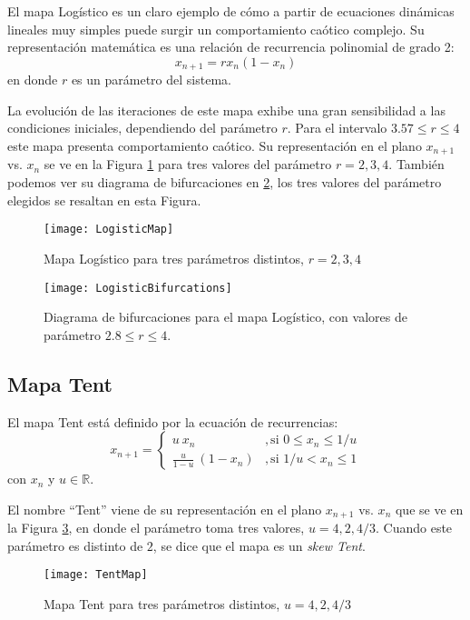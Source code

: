 El mapa Logístico es un claro ejemplo de cómo a partir de ecuaciones dinámicas lineales muy simples puede surgir un comportamiento caótico complejo. Su representación matemática es una relación de recurrencia polinomial de grado 2:
\begin{equation}\label{eqLogistico}
x_{n+1} = rx_n(1-x_n)
\end{equation}
en donde $r$ es un parámetro del sistema.

La evolución de las iteraciones de este mapa exhibe una gran sensibilidad a las condiciones iniciales, dependiendo del parámetro $r$. Para el intervalo $3.57 \leq r \leq 4$ este mapa presenta comportamiento caótico.
Su representación en el plano $x_{n+1}$ vs. $x_n$ se ve en la Figura \ref{figLogisticMap} para tres valores del parámetro $r = {2, 3, 4}$.
También podemos ver su diagrama de bifurcaciones en \ref{figLogisticBifurcations}, los tres valores del parámetro elegidos se resaltan en esta Figura.
\begin{figure}
	\centering\texttt{[image: LogisticMap]}
	\caption{Mapa Logístico para tres parámetros distintos, $r = {2, 3, 4}$}
	\label{figLogisticMap}
\end{figure}
\begin{figure}
	\centering\texttt{[image: LogisticBifurcations]}
	\caption{Diagrama de bifurcaciones para el mapa Logístico, con valores de parámetro $2.8 \leq r \leq 4$.}
	\label{figLogisticBifurcations}
\end{figure}

\subsection{Mapa Tent}

El mapa Tent está definido por la ecuación de recurrencias:
\begin{equation}\label{eqTent}
x_{n+1} =
\begin{cases}
u~x_n &, \textrm{si } 0\leq x_n\leq 1/u\\
\frac{u}{1-u}~(1-x_n) &, \textrm{si } 1/u< x_n\leq 1 
\end{cases}
\end{equation}
%
con $x_n$ y $u \in \mathbb{R}$.

El nombre ``Tent'' viene de su representación en el plano $x_{n+1}$ vs. $x_n$ que se ve en la Figura \ref{figTentMap}, en donde el parámetro toma tres valores, $u = {4, 2, 4/3}$.
Cuando este parámetro es distinto de $2$, se dice que el mapa es un \textit{skew Tent}.
\begin{figure}
	\centering\texttt{[image: TentMap]}
	\caption{Mapa Tent para tres parámetros distintos, $u = {4, 2, 4/3}$}
	\label{figTentMap}
\end{figure}

